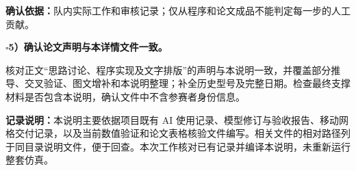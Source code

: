 \documentclass[UTF8,a4paper,12pt,fontset=windows]{ctexart}
\newcommand{\checkitem}[1]{\par\noindent$\square$\quad\textbf{#1}\par}
\begin{document}
\textbf{确认依据：}队内实际工作和审核记录；仅从程序和论文成品不能判定每一步的人工贡献。

\checkitem{5）确认论文声明与本详情文件一致。}
核对正文“思路讨论、程序实现及文字排版”的声明与本说明一致，并覆盖部分推导、交叉验证、图文增补和本说明整理；补全历史型号及完整日期。检查最终支撑材料是否包含本说明，确认文件中不含参赛者身份信息。

\vspace{0.25em}
\textbf{记录说明：}本说明主要依据项目既有 AI 使用记录、模型修订与验收报告、移动网格交付记录，以及当前数值验证和论文表格核验文件编写。相关文件的相对路径列于同目录说明文件，便于回查。本次工作核对已有记录并编译本说明，未重新运行整套仿真。
\end{document}
